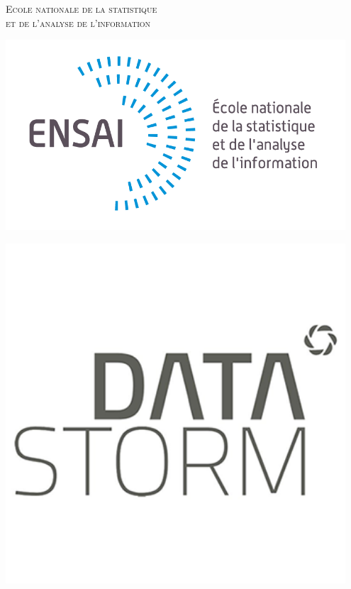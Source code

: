\textsc{{\LARGE Ecole nationale de la statistique \\et de l'analyse de l'information}} \\ %
\vspace{5mm}
\begin{minipage}{0.49\textwidth}
    \centering
    \includegraphics[width=0.95\textwidth]{Images/ensai_logo.png}\\[1.0 cm] %
\end{minipage}
\begin{minipage}{0.49\textwidth}
    \centering
    \includegraphics[width=0.95\textwidth]{Images/datastom_logo.png}\\[1.0 cm] %
\end{minipage}

